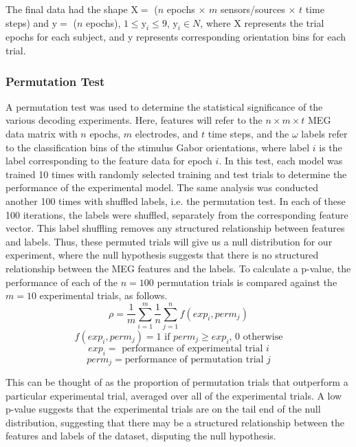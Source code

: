 \documentclass[../main.tex]{subfiles}
\begin{document}
The final data had the shape $\mathrm{X} = $ ($n$ epochs $\times$ $m$ sensors/sources $\times$ $t$ time steps) and $\mathrm{y} = $ ($n$ epochs), $1 \leq \mathrm{y}_i \leq 9$, $\mathrm{y}_i \in N$, where X represents the trial epochs for each subject, and y represents corresponding orientation bins for each trial.

\subsubsection{Permutation Test}
A permutation test was used to determine the statistical significance of the various decoding experiments. Here, features will refer to the $n \times m \times t$ MEG data matrix with $n$ epochs, $m$ electrodes, and $t$ time steps, and the $\omega$ labels refer to the classification bins of the stimulus Gabor orientations, where label $i$ is the label corresponding to the feature data for epoch $i$. In this test, each model was trained 10 times with randomly selected training and test trials to determine the performance of the experimental model.  The same analysis was conducted another 100 times with shuffled labels, i.e. the permutation test. In each of these 100 iterations, the labels were shuffled, separately from the corresponding feature vector. This label shuffling removes any structured relationship between features and labels. Thus, these permuted trials will give us a null distribution for our experiment, where the null hypothesis suggests that there is no structured relationship between the MEG features and the labels. To calculate a p-value, the performance of each of the $n = 100$ permutation trials is compared against the $m = 10$ experimental trials, as follows. 
$$\rho = \frac{1}{m}\sum_{i=1}^{m}{\frac{1}{n}\sum_{j=1}^{n}{f(exp_i, perm_j)}}$$
$$f(exp_i, perm_j) = 1 \mbox{ if } perm_j \geq exp_i \mbox{, } 0 \mbox{ otherwise}$$
$$ exp_i = \mbox{ performance of experimental trial } i$$
$$ perm_j = \mbox{performance of permutation trial } j $$

This can be thought of as the proportion of permutation trials that outperform a particular experimental trial, averaged over all of the experimental trials. A low p-value suggests that the experimental trials are on the tail end of the null distribution, suggesting that there may be a structured relationship between the features and labels of the dataset, disputing the null hypothesis.
\end{document}
